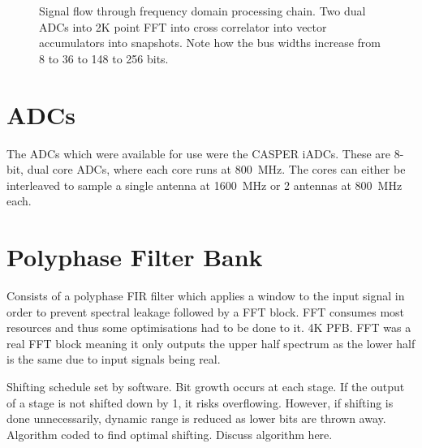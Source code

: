 \begin{landscape}
  \thispagestyle{empty}
  \begin{figure}
  \centering
  \caption{Signal flow through frequency domain processing chain. Two dual ADCs into 2K point FFT into cross correlator into vector accumulators into snapshots. Note how the bus widths increase from 8 to 36 to 148 to 256 bits.}
  \label{fig:roach-dev-frequency-domain-chain}
  \end{figure}
\end{landscape}

\section{ADCs}
The ADCs which were available for use were the CASPER iADCs. 
These are 8-bit, dual core ADCs, where each core runs at \SI{800}{\mega\hertz}. The cores can either be interleaved to sample a single antenna at \SI{1600}{\mega\hertz} or 2 antennas at \SI{800}{\mega\hertz} each.

\section{Polyphase Filter Bank}
Consists of a polyphase FIR filter which applies a window to the input signal in order to prevent spectral leakage followed by a FFT block. FFT consumes most resources and thus some optimisations had to be done to it. 4K PFB. FFT was a real FFT block meaning it only outputs the upper half spectrum as the lower half is the same due to input signals being real. 

Shifting schedule set by software. Bit growth occurs at each stage. If the output of a stage is not shifted down by 1, it risks overflowing. However, if shifting is done unnecessarily, dynamic range is reduced as lower bits are thrown away. Algorithm coded to find optimal shifting. Discuss algorithm here.

